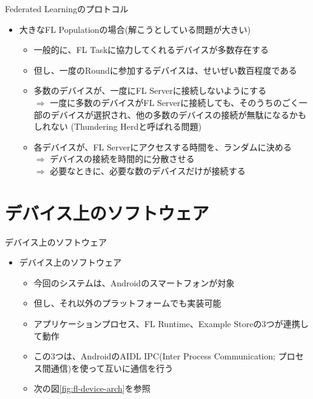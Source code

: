 \documentclass[dvipdfmx,notheorems,t]{beamer}
\begin{document}
\begin{frame}{Federated Learningのプロトコル}

\begin{itemize}
	\item 大きなFL Populationの場合(解こうとしている問題が大きい)
	\begin{itemize}
		\item 一般的に、FL Taskに協力してくれるデバイスが多数存在する
		\item 但し、一度のRoundに参加するデバイスは、せいぜい数百程度である
		\newline
		
		\item 多数のデバイスが、一度にFL Serverに接続しないようにする \\
		$\Rightarrow$ 一度に多数のデバイスがFL Serverに接続しても、そのうちのごく一部のデバイスが選択され、他の多数のデバイスの接続が無駄になるかもしれない (\alert{Thundering Herd}と呼ばれる問題)
		\newline
		
		\item 各デバイスが、FL Serverにアクセスする時間を、ランダムに決める \\
		$\Rightarrow$ デバイスの接続を時間的に分散させる \\
		$\Rightarrow$ 必要なときに、必要な数のデバイスだけが接続する
	\end{itemize}
\end{itemize}

\end{frame}

\section{デバイス上のソフトウェア}

\begin{frame}{デバイス上のソフトウェア}

\begin{itemize}
	\item デバイス上のソフトウェア
	\begin{itemize}
		\item 今回のシステムは、Androidのスマートフォンが対象
		\item 但し、それ以外のプラットフォームでも実装可能
		\newline
		
		\item アプリケーションプロセス、\alert{FL Runtime}、\alert{Example Store}の3つが連携して動作
		\item この3つは、AndroidのAIDL IPC(Inter Process Communication; プロセス間通信)を使って互いに通信を行う
		\item 次の図\ref{fig:fl-device-arch}を参照
	\end{itemize}
\end{itemize}

\end{frame}
\end{document}
